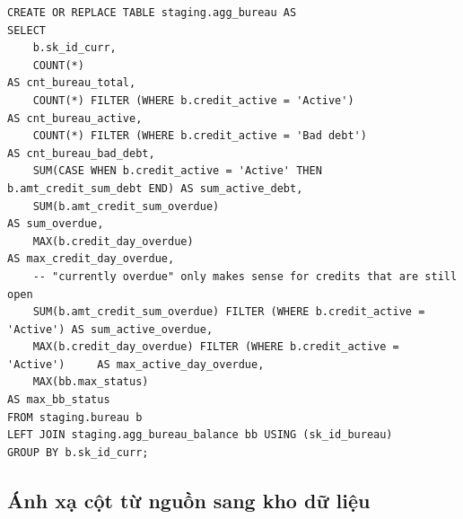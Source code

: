 \begin{listing}[H]
	\footnotesize
	\begin{verbatim}
CREATE OR REPLACE TABLE staging.agg_bureau AS
SELECT
    b.sk_id_curr,
    COUNT(*)                                                          AS cnt_bureau_total,
    COUNT(*) FILTER (WHERE b.credit_active = 'Active')                AS cnt_bureau_active,
    COUNT(*) FILTER (WHERE b.credit_active = 'Bad debt')              AS cnt_bureau_bad_debt,
    SUM(CASE WHEN b.credit_active = 'Active' THEN b.amt_credit_sum_debt END) AS sum_active_debt,
    SUM(b.amt_credit_sum_overdue)                                     AS sum_overdue,
    MAX(b.credit_day_overdue)                                         AS max_credit_day_overdue,
    -- "currently overdue" only makes sense for credits that are still open
    SUM(b.amt_credit_sum_overdue) FILTER (WHERE b.credit_active = 'Active') AS sum_active_overdue,
    MAX(b.credit_day_overdue) FILTER (WHERE b.credit_active = 'Active')     AS max_active_day_overdue,
    MAX(bb.max_status)                                                AS max_bb_status
FROM staging.bureau b
LEFT JOIN staging.agg_bureau_balance bb USING (sk_id_bureau)
GROUP BY b.sk_id_curr;
\end{verbatim}
	\caption{Truy vấn gộp lịch sử tín dụng ngoài theo khách hàng}
	\label{sql:agg_credit}
\end{listing}

\subsection{Ánh xạ cột từ nguồn sang kho dữ liệu}

